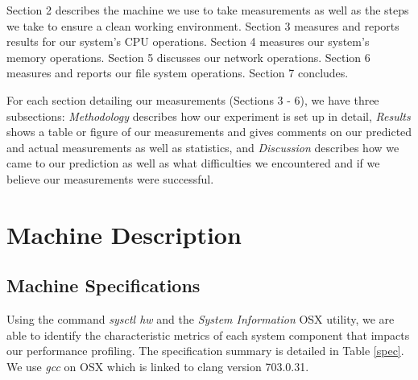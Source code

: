 \documentclass[sigconf]{acmart}
\begin{document}
Section 2 describes the machine we use to take measurements as well as the steps we take to ensure a clean working environment. Section 3 measures and reports results for our system's CPU operations. Section 4 measures our system's memory operations. Section 5 discusses our network operations. Section 6 measures and reports our file system operations. Section 7 concludes.

For each section detailing our measurements (Sections 3 - 6), we have three subsections: \textit{Methodology} describes how our experiment is set up in detail, \textit{Results} shows a table or figure of our measurements and gives comments on our predicted and actual measurements as well as statistics, and \textit{Discussion} describes how we came to our prediction as well as what difficulties we encountered and if we believe our measurements were successful.

\section{Machine Description}
\subsection{Machine Specifications}
Using the command \textit{sysctl hw} and the \textit{System Information} OSX utility, we are able to identify the characteristic metrics of each system component that impacts our performance profiling. The specification summary is detailed in Table \ref{spec}. We use \textit{gcc} on OSX which is linked to clang version 703.0.31.
\end{document}
